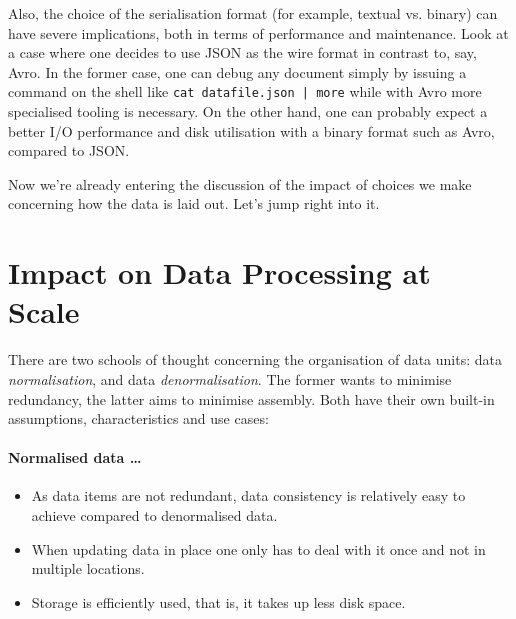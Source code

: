 \documentclass{llncs}
\begin{document}
Also, the choice of the serialisation format (for example, textual vs. binary) 
can have severe implications, both in terms of performance and maintenance.
Look at a case where one decides to use JSON as the wire format in contrast to,
say, Avro. In the former case, one can debug any document simply by issuing a 
command on the shell like \texttt{cat datafile.json | more} while with Avro 
more 
specialised tooling is necessary. On the other hand, one can probably expect a 
better I/O performance and disk utilisation with a binary format such as Avro,
compared to JSON.

Now we're already entering the discussion of the impact of choices we make 
concerning how the data is laid out. Let's jump right into it.

\section{Impact on Data Processing at Scale}
\label{sec:ldp}
There are two schools of thought concerning the organisation of data units:
data \emph{normalisation}, and data \emph{denormalisation}. The former
wants to minimise redundancy, the latter aims to minimise assembly. Both
have their own built-in assumptions, characteristics and use cases:

\paragraph{Normalised data \ldots} 
\begin{itemize}
	\item As data items are not redundant, data consistency is 
relatively easy to achieve compared to denormalised data.
	\item When updating data in place one only has to deal with it once and
not in multiple locations.
	\item Storage is efficiently used, that is, it takes up less disk space.
\end{itemize}
\end{document}
